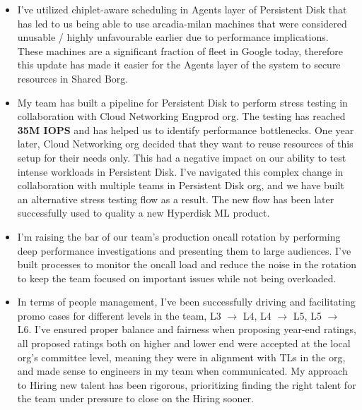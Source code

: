 \documentclass[10pt,a4paper,sans]{moderncv}
\begin{document}
{\begin{itemize}
		\item I've utilized chiplet-aware scheduling in Agents layer of Persistent Disk that has led to us being able to use arcadia-milan machines that were considered unusable / highly unfavourable earlier due to performance implications. These machines are a significant fraction of fleet in Google today, therefore this update has made it easier for the Agents layer of the system to secure resources in Shared Borg.
		\item My team has built a pipeline for Persistent Disk to perform stress testing in collaboration with Cloud Networking Engprod org. The testing has reached \textbf{35M IOPS} and has helped us to identify performance bottlenecks. One year later, Cloud Networking org decided that they want to reuse resources of this setup for their needs only. This had a negative impact on our ability to test intense workloads in Persistent Disk. I've navigated this complex change in collaboration with multiple teams in Persistent Disk org, and we have built an alternative stress testing flow as a result. The new flow has been later successfully used to quality a new Hyperdisk ML product.
		\item I'm raising the bar of our team's production oncall rotation by performing deep performance investigations and presenting them to large audiences. I've built processes to monitor the oncall load and reduce the noise in the rotation to keep the team focused on important issues while not being overloaded.
		\item In terms of people management, I've been successfully driving and facilitating promo cases for different levels in the team, L3 $\rightarrow$ L4, L4 $\rightarrow$ L5, L5 $\rightarrow$ L6. I've ensured proper balance and fairness when proposing year-end ratings, all proposed ratings both on higher and lower end were accepted at the local org's committee level, meaning they were in alignment with TLs in the org, and made sense to engineers in my team when communicated. My approach to Hiring new talent has been rigorous, prioritizing finding the right talent for the team under pressure to close on the Hiring sooner.
	\end{itemize}
}
\end{document}
